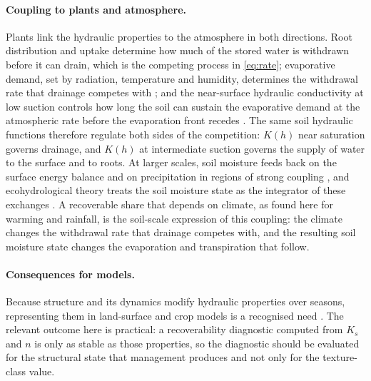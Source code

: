 \documentclass[preprint,12pt,authoryear]{elsarticle}
\begin{document}
\paragraph{Coupling to plants and atmosphere.} Plants link the hydraulic properties to the atmosphere in both directions. Root distribution and uptake determine how much of the stored water is withdrawn before it can drain, which is the competing process in \cref{eq:rate}; evaporative demand, set by radiation, temperature and humidity, determines the withdrawal rate that drainage competes with \citep{Roderick2002,Brutsaert1998}; and the near-surface hydraulic conductivity at low suction controls how long the soil can sustain the evaporative demand at the atmospheric rate before the evaporation front recedes \citep{Or2013,Lehmann2008,Shokri2011}. The same soil hydraulic functions therefore regulate both sides of the competition: $K(h)$ near saturation governs drainage, and $K(h)$ at intermediate suction governs the supply of water to the surface and to roots. At larger scales, soil moisture feeds back on the surface energy balance and on precipitation in regions of strong coupling \citep{Entekhabi1996,Koster2004,Seneviratne2010}, and ecohydrological theory treats the soil moisture state as the integrator of these exchanges \citep{Rodriguez2004}. A recoverable share that depends on climate, as found here for warming and rainfall, is the soil-scale expression of this coupling: the climate changes the withdrawal rate that drainage competes with, and the resulting soil moisture state changes the evaporation and transpiration that follow.

\paragraph{Consequences for models.} Because structure and its dynamics modify hydraulic properties over seasons, representing them in land-surface and crop models is a recognised need \citep{Fatichi2020,Vereecken2016,Vereecken2019}. The relevant outcome here is practical: a recoverability diagnostic computed from $K_s$ and $n$ is only as stable as those properties, so the diagnostic should be evaluated for the structural state that management produces and not only for the texture-class value.
\end{document}
